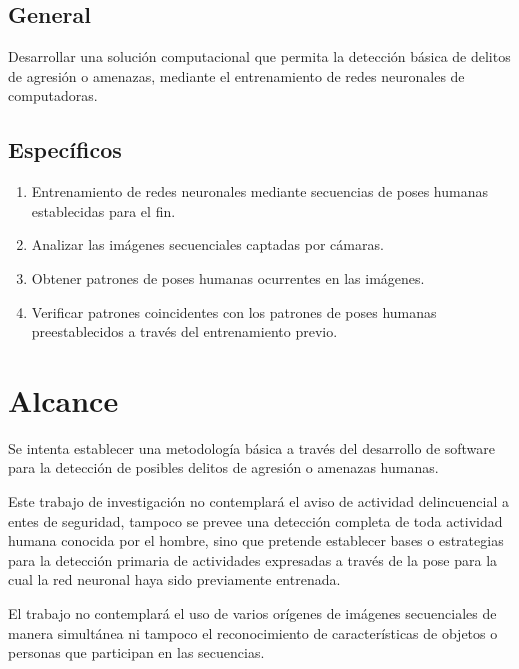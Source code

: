 \documentclass[a4paper,12pt,oneside,spanish]{book}
\begin{document}
\subsection{General}
Desarrollar una solución computacional que permita la detección básica de delitos de agresión o amenazas, mediante el entrenamiento de redes neuronales de computadoras.\par 

\subsection{Específicos}
\begin{enumerate}
	\baselineskip 16pt
	\item Entrenamiento de redes neuronales mediante secuencias de poses humanas establecidas
para el fin.\par 
	\item Analizar las imágenes secuenciales captadas por cámaras.
\par 
	\item Obtener patrones de poses humanas ocurrentes en las imágenes.\par 
	\item Verificar patrones coincidentes con los patrones de poses humanas preestablecidos a través del entrenamiento previo.\par 
\end{enumerate}	\baselineskip 16pt

\section{Alcance}
Se intenta establecer una metodología básica a través del desarrollo de software para la detección de posibles delitos de agresión o amenazas humanas.\par

Este trabajo de investigación no contemplará el aviso de actividad delincuencial a entes de seguridad, tampoco se prevee una detección completa de toda actividad humana conocida por el hombre, sino que pretende establecer bases o estrategias para la detección primaria de  actividades expresadas a través de la pose para la cual la red neuronal haya sido previamente entrenada.\par

El trabajo no contemplará el uso de varios orígenes de imágenes secuenciales de manera simultánea ni tampoco el reconocimiento de características de objetos o personas que participan en las secuencias.\par
\end{document}
